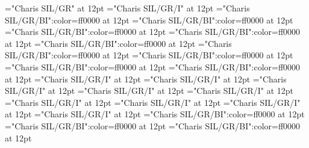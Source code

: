\documentclass[a4paper]{article}
\begin{document}
\pagestyle{plain}
\sloppy
\setlength{\parfillskip}{0pt plus 1fil}
\font\sectionletter="Charis SIL/GR" at 12pt
\font\articlesectionletter="Charis SIL/GR/I" at 12pt
\font\firstoftypesensearticlesectionletter="Charis SIL/GR/BI":color=ff0000 at 12pt
\font\firstoftypegrammarcategorylastoftypefirstoftypesensearticlesectionletter="Charis SIL/GR/BI":color=ff0000 at 12pt
\font{}="Charis SIL/GR/BI":color=ff0000 at 12pt
\font\firstoftypelastoftypewordusedefinitionfirstoftypelastoftypefirstoftypesensearticlesectionletter="Charis SIL/GR/BI":color=ff0000 at 12pt
\font\lastoftypesensearticlesectionletter="Charis SIL/GR/BI":color=ff0000 at 12pt
\font\firstoftypegrammarcategorylastoftypelastoftypesensearticlesectionletter="Charis SIL/GR/BI":color=ff0000 at 12pt
\font{}="Charis SIL/GR/BI":color=ff0000 at 12pt
\font\firstoftypelastoftypewordusedefinitionfirstoftypelastoftypelastoftypesensearticlesectionletter="Charis SIL/GR/BI":color=ff0000 at 12pt
\font\examplefirstoftypelastoftypelastoftypesensearticlesectionletter="Charis SIL/GR/BI":color=ff0000 at 12pt
\font\firstoftypelastoftypesubentryarticlesectionletter="Charis SIL/GR/I" at 12pt
\font\firstoftypeheadwordlastoftypefirstoftypelastoftypesubentryarticlesectionletter="Charis SIL/GR/I" at 12pt
\font\examplefirstoftypelastoftypefirstoftypelastoftypesubentryarticlesectionletter="Charis SIL/GR/I" at 12pt
\font\firstoftypeheadwordlastoftypearticlesectionletter="Charis SIL/GR/I" at 12pt
\font\firstoftypelastoftypepronunciationarticlesectionletter="Charis SIL/GR/I" at 12pt
\font\firstoftypelastoftypestressfirstoftypelastoftypepronunciationarticlesectionletter="Charis SIL/GR/I" at 12pt
\font\firstoftypevariantinflectionarticlesectionletter="Charis SIL/GR/I" at 12pt
\font\variantinflectionarticlesectionletter="Charis SIL/GR/I" at 12pt
\font\lastoftypevariantinflectionarticlesectionletter="Charis SIL/GR/I" at 12pt
\font\exampleusefirstoftypelastoftypefirstoftypesensearticlesectionletter="Charis SIL/GR/BI":color=ff0000 at 12pt
\font\examplefirstoftypelastoftypefirstoftypesensearticlesectionletter="Charis SIL/GR/BI":color=ff0000 at 12pt
\font\exampleusefirstoftypelastoftypelastoftypesensearticlesectionletter="Charis SIL/GR/BI":color=ff0000 at 12pt

\mbox{} 
\newpage 
\newpage 
\setcounter{page}{1} 
\pagestyle{fancy} 
\end{document}
